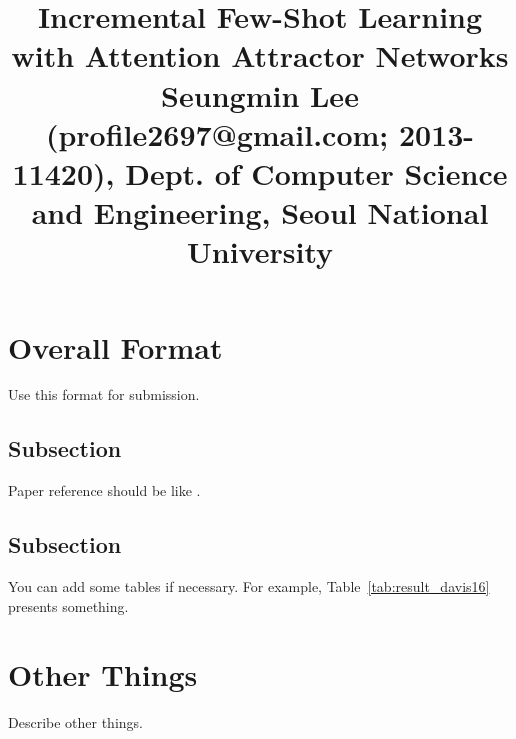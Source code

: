 \documentclass[10pt,twocolumn,letterpaper]{article}
\begin{document}
\title{Incremental Few-Shot Learning with Attention Attractor Networks\\ {\rm {\normalsize Seungmin Lee (profile2697@gmail.com; 2013-11420), Dept. of Computer Science and Engineering, Seoul National University}}}   %

\maketitle
\thispagestyle{empty}


\section{Overall Format}
Use this format for submission.


\subsection{Subsection}
Paper reference should be like \cite{wug2018fast}.

\subsection{Subsection}
You can add some tables if necessary.
For example, Table~\ref{tab:result_davis16} presents something.
%
\begin{table}[t]
\caption{Comparison.}
\begin{center}
\end{center}
\label{tab:result_davis16}
\end{table}
%
 

\section{Other Things}
Describe other things.


{\small


}
\end{document}
